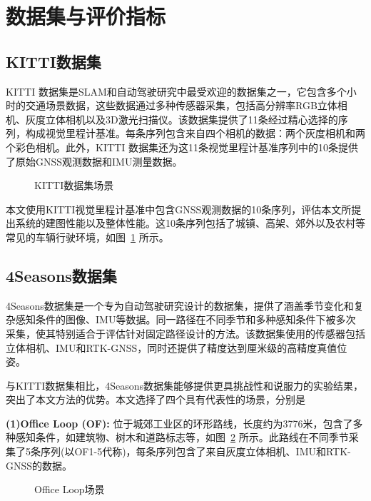 \section{数据集与评价指标}
\subsection{KITTI数据集}
KITTI 数据集\cite{Geiger2012CVPR}是SLAM和自动驾驶研究中最受欢迎的数据集之一，它包含多个小时的交通场景数据，这些数据通过多种传感器采集，包括高分辨率RGB立体相机、灰度立体相机以及3D激光扫描仪。该数据集提供了11条经过精心选择的序列，构成视觉里程计基准。每条序列包含来自四个相机的数据：两个灰度相机和两个彩色相机。此外，KITTI 数据集还为这11条视觉里程计基准序列中的10条提供了原始GNSS观测数据和IMU测量数据。

\begin{figure}
  \centering
  \caption{KITTI数据集场景}
  \label{fig:kitti_data}
\end{figure}

本文使用KITTI视觉里程计基准中包含GNSS观测数据的10条序列，评估本文所提出系统的建图性能以及整体性能。这10条序列包括了城镇、高架、郊外以及农村等常见的车辆行驶环境，如图~\ref{fig:kitti_data} 所示。

\subsection{4Seasons数据集}
4Seasons数据集\cite{wenzel20214seasons}是一个专为自动驾驶研究设计的数据集，提供了涵盖季节变化和复杂感知条件的图像、IMU等数据。同一路径在不同季节和多种感知条件下被多次采集，使其特别适合于评估针对固定路径设计的方法。该数据集使用的传感器包括立体相机、IMU和RTK-GNSS，同时还提供了精度达到厘米级的高精度真值位姿。

与KITTI数据集相比，4Seasons数据集能够提供更具挑战性和说服力的实验结果，突出了本文方法的优势。本文选择了四个具有代表性的场景，分别是

\textbf{(1)Office Loop (OF):} 位于城郊工业区的环形路线，长度约为3776米，包含了多种感知条件，如建筑物、树木和道路标志等，如图~\ref{fig:OF_data} 所示。此路线在不同季节采集了5条序列(以OF1-5代称)，每条序列包含了来自灰度立体相机、IMU和RTK-GNSS的数据。
\begin{figure}
  \centering
  \caption{Office Loop场景}
  \label{fig:OF_data}
\end{figure}

